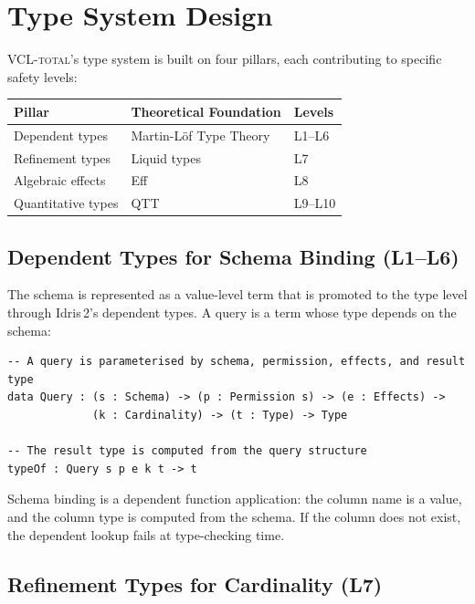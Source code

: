\documentclass[11pt,a4paper]{article}
\newcommand{\VCL}{\textsc{VCL-total}}
\begin{document}
\section{Type System Design}\label{sec:typesystem}

\VCL{}'s type system is built on four pillars, each contributing to
specific safety levels:

\begin{center}
\begin{tabular}{lll}
\toprule
\textbf{Pillar} & \textbf{Theoretical Foundation} & \textbf{Levels} \\
\midrule
Dependent types & Martin-L\"of Type Theory & L1--L6 \\
Refinement types & Liquid types \citep{rondon2008liquid} & L7 \\
Algebraic effects & Eff \citep{bauer2015programming} & L8 \\
Quantitative types & QTT \citep{atkey2018syntax,mcbride2016got} & L9--L10 \\
\bottomrule
\end{tabular}
\end{center}

\subsection{Dependent Types for Schema Binding (L1--L6)}

The schema is represented as a value-level term that is promoted to
the type level through Idris\,2's dependent types.  A query is a
term whose type depends on the schema:

\begin{lstlisting}[language=Idris2]
-- A query is parameterised by schema, permission, effects, and result type
data Query : (s : Schema) -> (p : Permission s) -> (e : Effects) ->
             (k : Cardinality) -> (t : Type) -> Type

-- The result type is computed from the query structure
typeOf : Query s p e k t -> t
\end{lstlisting}

Schema binding is a dependent function application: the column name
is a value, and the column type is computed from the schema.  If the
column does not exist, the dependent lookup fails at type-checking
time.

\subsection{Refinement Types for Cardinality (L7)}
\end{document}
